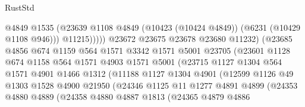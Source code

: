 \begin{lexlean}{RustStd}
\begin{coremodule}
{{                                    @4849
                                    @1535
                                    (@23639
                                      @1108
                                      @4849
                                      (@10423 (@10424 @4849))
                                      (@6231 (@10429 @1108 @946)))
                                    @11215)))))
                          @23672
                          @23675
                          @23678
                          @23680
                          @11232)
                        (@23685
                          @4856
                          @674
                          @1159
                          @564
                          @1571
                          @3342
                          @1571
                          @5001
                          @23705
                          (@23601
                            @1128
                            @674
                            @1158
                            @564
                            @1571
                            @4903
                            @1571
                            @5001
                            (@23715
                              @1127
                              @1304
                              @564
                              @1571
                              @4901
                              @1466
                              @1312
                              (@11188
                                @1127
                                @1304
                                @4901
                                (@12599
                                  @1126
                                  @49
                                  @1303
                                  @1528
                                  @4900
                                  @21950
                                  (@24346
                                    @1125
                                    @11
                                    @1277
                                    @4891
                                    @4899
                                    (@24353
                                      @4880
                                      @4889
                                      (@24358
                                        @4880
                                        @4887
                                        @1813
                                        (@24365
                                          @4879
                                          @4886
}}
\end{coremodule}
\end{lexlean}

